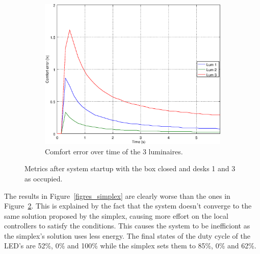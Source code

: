 \begin{figure}[ht]
\begin{subfigure}[t]{0.32\textwidth}
    \centering
    \includegraphics[width=.95\textwidth]{img/n_closed_o101}
    \caption{Comfort error over time of the 3 luminaires.}
    \label{fig:n_closed_o101}
    \end{subfigure}
    \caption{Metrics after system startup with the box closed and desks 1 and 3 as occupied. }
    \label{fig:closed_o101}
\end{figure}

The results in Figure~\ref{figres_simplex}  are clearly worse than the ones in Figure~\ref{fig:closed_o101}. This is explained by the fact that the system doesn't converge to the same solution proposed by the simplex, causing more effort on the local controllers to satisfy the conditions. This causes the system to be inefficiont as the simplex's solution uses less energy. The final states of the duty cycle of the LED's are 52\%, 0\% and 100\% while the simplex sets them to 85\%, 0\% and 62\%.


